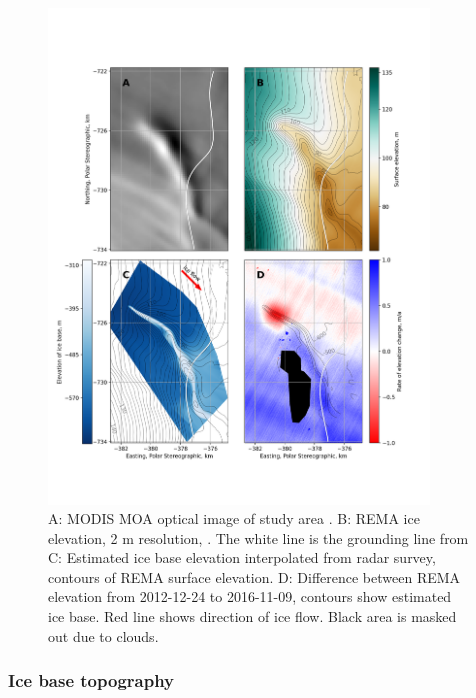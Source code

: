 \begin{figure}[!ht]
\centering
\includegraphics[width=0.9\textwidth]{chapters/2/4square_channel.png}
\caption[Channel observations]{A: MODIS MOA optical image of study area \citep{haran2014modis}. B: REMA ice elevation, 2 m resolution, \citep{howat2019reference}. The white line is the grounding line from \cite{depoorter2013amii} C: Estimated ice base elevation interpolated from radar survey, contours of REMA surface elevation.  D: Difference between REMA elevation from 2012-12-24 to 2016-11-09, contours show estimated ice base.  Red line shows direction of ice flow. Black area is masked out due to clouds.}
\label{fig:4square_channel}
\end{figure}  

\subsubsection{Ice base topography} \label{sec:icebasetopog}

